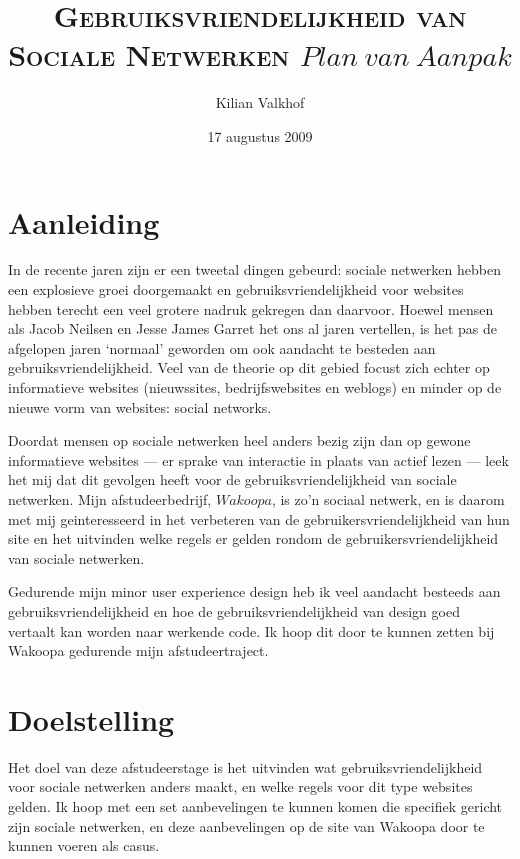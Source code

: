\documentclass[a4paper, 10pt, twoside, pdftex]{article}
\title{\textsc{Gebruiksvriendelijkheid van Sociale Netwerken} \linebreak $Plan~van~Aanpak$}
\author{Kilian Valkhof}
\date{17 augustus 2009}
\begin{document}
\maketitle

\begin{quote}

\end{quote}
\newpage
\tableofcontents

\newpage
\section{Aanleiding}
In de recente jaren zijn er een tweetal dingen gebeurd: sociale netwerken hebben een explosieve groei doorgemaakt
en gebruiksvriendelijkheid voor websites hebben terecht een veel grotere nadruk gekregen dan daarvoor. Hoewel mensen
als Jacob Neilsen en Jesse James Garret het ons al jaren vertellen, is het pas de afgelopen jaren `normaal' geworden
om ook aandacht te besteden aan gebruiksvriendelijkheid. Veel van de theorie op dit gebied focust zich echter op
informatieve websites (nieuwssites, bedrijfswebsites en weblogs) en minder op de nieuwe vorm van websites: social networks.

Doordat mensen op sociale netwerken heel anders bezig zijn dan op gewone informatieve websites --- er sprake van interactie in plaats van actief lezen ---
leek het mij dat dit gevolgen heeft voor de gebruiksvriendelijkheid
van sociale netwerken. Mijn afstudeerbedrijf, $Wakoopa$, is zo'n sociaal netwerk, en is daarom met mij geinteresseerd in het verbeteren
van de gebruikersvriendelijkheid van hun site en het uitvinden welke regels er gelden rondom de gebruikersvriendelijkheid van sociale netwerken.

Gedurende mijn minor user experience design heb ik veel aandacht besteeds aan gebruiksvriendelijkheid en hoe de gebruiksvriendelijkheid van design
goed vertaalt kan worden naar werkende code. Ik hoop dit door te kunnen zetten bij Wakoopa gedurende mijn afstudeertraject.

\section{Doelstelling}
Het doel van deze afstudeerstage is het uitvinden wat gebruiksvriendelijkheid voor sociale netwerken anders maakt, en welke regels voor dit type websites gelden.
Ik hoop met een set aanbevelingen te kunnen komen die specifiek gericht zijn sociale netwerken, en deze aanbevelingen op de site van Wakoopa door te kunnen voeren als casus.
\end{document}
